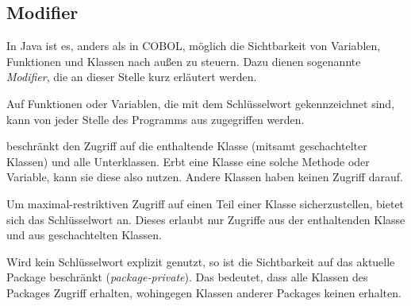 \subsection{Modifier}
In Java ist es, anders als in COBOL, möglich die Sichtbarkeit von Variablen, Funktionen und Klassen nach außen zu steuern. Dazu dienen sogenannte \textit{Modifier}, die an dieser Stelle kurz erläutert werden.

Auf Funktionen oder Variablen, die mit dem Schlüsselwort  gekennzeichnet sind, kann von jeder Stelle des Programms aus zugegriffen werden.

 beschränkt den Zugriff auf die enthaltende Klasse (mitsamt geschachtelter Klassen) und alle Unterklassen. Erbt eine Klasse eine solche Methode oder Variable, kann sie diese also nutzen. Andere Klassen haben keinen Zugriff darauf.

Um maximal-restriktiven Zugriff auf einen Teil einer Klasse sicherzustellen, bietet sich das Schlüsselwort  an. Dieses erlaubt nur Zugriffe aus der enthaltenden Klasse und aus geschachtelten Klassen.

Wird kein Schlüsselwort explizit genutzt, so ist die Sichtbarkeit auf das aktuelle Package beschränkt (\engl \textit{package-private}). Das bedeutet, dass alle Klassen des Packages Zugriff erhalten, wohingegen Klassen anderer Packages keinen erhalten.